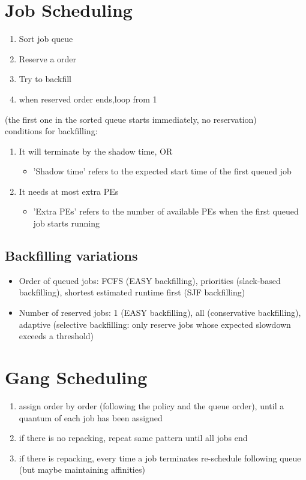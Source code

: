 \section{Job Scheduling}
\begin{enumerate}
    \item Sort job queue
    \item Reserve a order
    \item Try to backfill
    \item when reserved order ends,loop from 1
\end{enumerate}
(the first one in the sorted queue starts immediately, no reservation) \\
conditions for backfilling:
\begin{enumerate}
  \item It will terminate by the shadow time, OR
  \begin{itemize}
    \item 'Shadow time' refers to the expected start time of the first queued job
  \end{itemize}

  \item It needs at most extra PEs
  \begin{itemize}
    \item 'Extra PEs' refers to the number of available PEs when the first queued job starts running
  \end{itemize}
  \end{enumerate}
  \subsection{Backfilling variations}
  \begin{itemize}
  \item Order of queued jobs:
FCFS (EASY backfilling), priorities (slack-based backfilling), shortest estimated runtime first (SJF backfilling)
  \item Number of reserved jobs:
  1 (EASY backfilling), all (conservative backfilling), adaptive (selective backfilling: only reserve jobs whose expected slowdown exceeds a threshold)

\end{itemize}
\section{Gang Scheduling}
\begin{enumerate}
    \item assign order by order (following the policy and the queue order), until a quantum of each job has been assigned
    \item if there is no repacking, repeat same pattern until all jobs end
    \item if there is repacking, every time a job terminates re-schedule following queue (but maybe maintaining affinities)
\end{enumerate}



